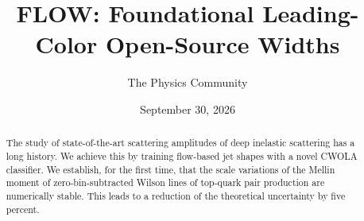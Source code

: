 \documentclass[11pt]{article}
\title{FLOW: Foundational Leading-Color Open-Source Widths}
\author{The Physics Community}
\date{September 30, 2026}
\begin{document}
\maketitle
\begin{abstract}
The study of state-of-the-art scattering amplitudes of deep inelastic
scattering has a long history. We achieve this by training flow-based
jet shapes with a novel CWOLA classifier. We establish, for the first
time, that the scale variations of the Mellin moment of
zero-bin-subtracted Wilson lines of top-quark pair production are
numerically stable. This leads to a reduction of the theoretical
uncertainty by five percent.
\end{abstract}
\tableofcontents





\nocite{*}


\end{document}

